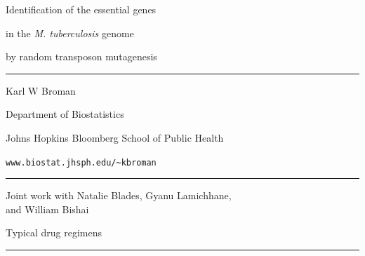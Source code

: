 \documentclass[12pt]{article}
\newcommand{\titlesize}{\fontsize{40}{50} \selectfont}
\newcommand{\headsize}{\fontsize{35}{35} \selectfont}
\newcommand{\textsize}{\fontsize{30}{35} \selectfont}
\newcommand{\smallsize}{\fontsize{25}{30} \selectfont}
\newcommand{\headcolor}{\color [cmyk]{0.72,0.67,0.33,0}}
\newcommand{\linecolor}{\color [named]{Thistle}}
\newcommand{\pointcolor}{\color [named]{Bittersweet}}
\begin{document}
\landscape

\begin{center}
\titlesize \headcolor

\vspace*{1mm}

Identification of the {\pointcolor essential} genes

in the \emph{M. tuberculosis\/} genome

by random transposon mutagenesis

\linecolor 
\rule{10in}{2mm}
\vspace{-10mm}

\normalcolor \textsize
Karl W Broman
\vspace{5mm}

{\smallsize Department of Biostatistics

Johns Hopkins Bloomberg School of Public Health
\vspace{10mm}


\verb|www.biostat.jhsph.edu/~kbroman|

\vspace{5mm}

\linecolor \rule{10in}{2mm}
\vspace{-2mm}

\normalcolor
Joint work with Natalie Blades, Gyanu Lamichhane,  \\
and William Bishai}
\end{center}




\newpage

\headsize \headcolor
\centerline{Typical drug regimens}
\linecolor \noindent \rule[3mm]{10in}{2mm}

\vspace{5mm}
\smallsize \normalcolor
\end{document}
